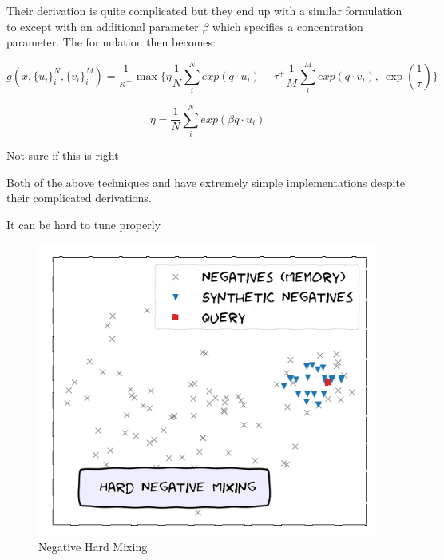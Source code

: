 \documentclass[12pt]{article}
\begin{document}
Their derivation is quite complicated but they end up with a similar formulation to \cite{chuang_debiased_2020} except with an additional parameter $\beta$ which specifies a concentration parameter. The formulation then becomes:

$$g(x, \{u_i\}^N_i, \{v_i\}^M_i) = \frac{1}{\kappa^-}\max \{ \eta \frac{1}{N} \sum_i^N exp(q \cdot u_i)  - \tau^+\frac{1}{M} \sum_i^M exp(q \cdot v_i), \: \exp(\frac{1}{\tau})\}$$

$$\eta = \frac{1}{N} \sum_i^N exp(\beta q \cdot u_i) $$

Not sure if this is right

Both of the above techniques \cite{chuang_debiased_2020} and \cite{robinson_contrastive_2021} have extremely simple implementations despite their complicated derivations.

It can be hard to tune properly
%

\begin{figure}[h!]
    \begin{center}
        \includegraphics[scale=0.35]{images/synthetic-negatives.png}
        \caption{Negative Hard Mixing \cite{kalantidis_hard_nodate}}
    \end{center}
\end{figure}
\end{document}
